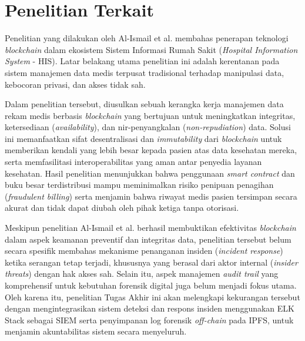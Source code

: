 \section{Penelitian Terkait}
Penelitian yang dilakukan oleh Al-Ismail et al. \cite{7} membahas penerapan teknologi \textit{blockchain} dalam ekosistem Sistem Informasi Rumah Sakit (\textit{Hospital Information System} - HIS). Latar belakang utama penelitian ini adalah kerentanan pada sistem manajemen data medis terpusat tradisional terhadap manipulasi data, kebocoran privasi, dan akses tidak sah.

Dalam penelitian tersebut, diusulkan sebuah kerangka kerja manajemen data rekam medis berbasis \textit{blockchain} yang bertujuan untuk meningkatkan integritas, ketersediaan (\textit{availability}), dan nir-penyangkalan (\textit{non-repudiation}) data. Solusi ini memanfaatkan sifat desentralisasi dan \textit{immutability} dari \textit{blockchain} untuk memberikan kendali yang lebih besar kepada pasien atas data kesehatan mereka, serta memfasilitasi interoperabilitas yang aman antar penyedia layanan kesehatan. Hasil penelitian menunjukkan bahwa penggunaan \textit{smart contract} dan buku besar terdistribusi mampu meminimalkan risiko penipuan penagihan (\textit{fraudulent billing}) serta menjamin bahwa riwayat medis pasien tersimpan secara akurat dan tidak dapat diubah oleh pihak ketiga tanpa otorisasi.

Meskipun penelitian Al-Ismail et al. berhasil membuktikan efektivitas \textit{blockchain} dalam aspek keamanan preventif dan integritas data, penelitian tersebut belum secara spesifik membahas mekanisme penanganan insiden (\textit{incident response}) ketika serangan tetap terjadi, khususnya yang berasal dari aktor internal (\textit{insider threats}) dengan hak akses sah. Selain itu, aspek manajemen \textit{audit trail} yang komprehensif untuk kebutuhan forensik digital juga belum menjadi fokus utama. Oleh karena itu, penelitian Tugas Akhir ini akan melengkapi kekurangan tersebut dengan mengintegrasikan sistem deteksi dan respons insiden menggunakan ELK Stack sebagai SIEM serta penyimpanan log forensik \textit{off-chain} pada IPFS, untuk menjamin akuntabilitas sistem secara menyeluruh.